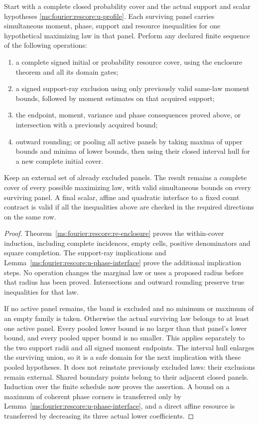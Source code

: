 \begin{theorem}\label{ms:fourier:rescore:u-contract}
Start with a complete closed probability cover and the actual support
and scalar hypotheses \eqref{ms:fourier:rescore:u-profile}.  Each surviving panel carries
simultaneous moment, phase, support and resource inequalities for one
hypothetical maximizing law in that panel.  Perform any declared finite
sequence of the following operations:
\begin{enumerate}
\item a complete signed initial or probability resource cover, using
      the enclosure theorem and all its domain gates;
\item a signed support-ray exclusion using only previously valid
      same-law moment bounds, followed by moment estimates on that
      acquired support;
\item the endpoint, moment, variance and phase consequences proved
      above, or intersection with a previously acquired bound;
\item outward rounding; or pooling all active panels by taking maxima
      of upper bounds and minima of lower bounds, then using their
      closed interval hull for a new complete initial cover.
\end{enumerate}
Keep an external set of already excluded panels.  The result remains a
complete cover of every possible maximizing law, with valid simultaneous
bounds on every surviving panel.  A final scalar, affine and quadratic
interface to a fixed count contract is valid if all the inequalities
above are checked in the required directions on the same row.
\end{theorem}
\begin{proof}
Theorem~\ref{ms:fourier:rescore:re-enclosure} proves the
within-cover induction, including complete incidences, empty cells,
positive denominators and square completion.  The support-ray implications and Lemma~\ref{ms:fourier:rescore:u-phase-interface}
prove the additional implication steps.
No operation changes the marginal law or uses a proposed radius before
that radius has been proved.  Intersections and outward rounding preserve
true inequalities for that law.

If no active panel remains, the band is excluded and no minimum or
maximum of an empty family is taken.  Otherwise the actual surviving
law belongs to at least one active panel.  Every pooled lower bound is no larger than that panel's lower
bound, and every pooled upper bound is no smaller.  This applies
separately to the two support radii and all signed moment endpoints.
The interval hull enlarges the surviving union, so it is a safe domain
for the next implication with these pooled hypotheses.  It does not
reinstate previously excluded laws: their exclusions remain external.
Shared boundary points belong to their adjacent closed panels.
Induction over the finite schedule now proves the assertion.  A bound
on a maximum of coherent phase corners is transferred only by
Lemma~\ref{ms:fourier:rescore:u-phase-interface}, and a direct affine resource is
transferred by decreasing its three actual lower coefficients.
\end{proof}

